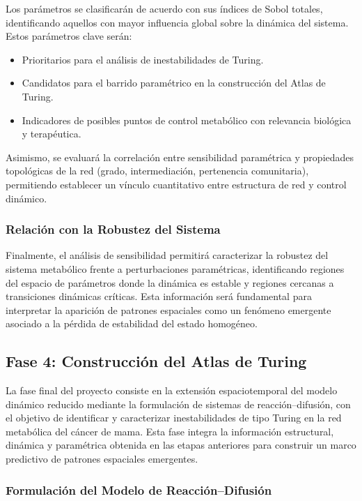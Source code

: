 \documentclass[12pt,spanish]{article}
\begin{document}
	Los parámetros se clasificarán de acuerdo con sus índices de Sobol totales, identificando aquellos con mayor influencia global sobre la dinámica del sistema. Estos parámetros clave serán:
	\begin{itemize}
		\item Prioritarios para el análisis de inestabilidades de Turing.
		\item Candidatos para el barrido paramétrico en la construcción del Atlas de Turing.
		\item Indicadores de posibles puntos de control metabólico con relevancia biológica y terapéutica.
	\end{itemize}
	
	Asimismo, se evaluará la correlación entre sensibilidad paramétrica y propiedades topológicas de la red (grado, intermediación, pertenencia comunitaria), permitiendo establecer un vínculo cuantitativo entre estructura de red y control dinámico.
	
	\subsubsection*{Relación con la Robustez del Sistema}
	
	Finalmente, el análisis de sensibilidad permitirá caracterizar la robustez del sistema metabólico frente a perturbaciones paramétricas, identificando regiones del espacio de parámetros donde la dinámica es estable y regiones cercanas a transiciones dinámicas críticas. Esta información será fundamental para interpretar la aparición de patrones espaciales como un fenómeno emergente asociado a la pérdida de estabilidad del estado homogéneo.
	
	
		\subsection*{Fase 4: Construcción del Atlas de Turing}
	
	La fase final del proyecto consiste en la extensión espaciotemporal del modelo dinámico reducido mediante la formulación de sistemas de reacción--difusión, con el objetivo de identificar y caracterizar inestabilidades de tipo Turing en la red metabólica del cáncer de mama. Esta fase integra la información estructural, dinámica y paramétrica obtenida en las etapas anteriores para construir un marco predictivo de patrones espaciales emergentes.
	
	\subsubsection*{Formulación del Modelo de Reacción--Difusión}
	
\end{document}
